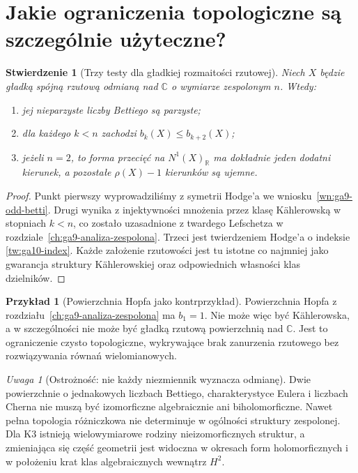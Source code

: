 \documentclass[11pt,a4paper,openany]{report}
\numberwithin{equation}{section}
\theoremstyle{plain}
\newtheorem{stwierdzenie}[twierdzenie]{Stwierdzenie}
\theoremstyle{definition}
\newtheorem{przyklad}[twierdzenie]{Przykład}
\theoremstyle{remark}
\newtheorem{uwaga}[twierdzenie]{Uwaga}
\newcommand{\R}{\mathbb R}
\newcommand{\C}{\mathbb C}
\begin{document}
\section{Jakie ograniczenia topologiczne są szczególnie użyteczne?}
\label{sec:ga10-konsekwencje}

\begin{stwierdzenie}[Trzy testy dla gładkiej rozmaitości rzutowej]
Niech $X$ będzie gładką spójną rzutową odmianą nad $\C$
o wymiarze zespolonym $n$. Wtedy:
\begin{enumerate}[label=\arabic*)]
\item jej nieparzyste liczby Bettiego są parzyste;
\item dla każdego $k<n$ zachodzi $b_k(X)\le b_{k+2}(X)$;
\item jeżeli $n=2$, to forma przecięć na $N^1(X)_{\R}$
ma dokładnie jeden dodatni kierunek, a pozostałe
$\rho(X)-1$ kierunków są ujemne.
\end{enumerate}
\end{stwierdzenie}
\begin{proof}
Punkt pierwszy wyprowadziliśmy z symetrii Hodge'a
we wniosku~\ref{wn:ga9-odd-betti}. Drugi wynika z
injektywności mnożenia przez klasę Kählerowską
w stopniach $k<n$, co zostało uzasadnione z twardego
Lefschetza w rozdziale~\ref{ch:ga9-analiza-zespolona}.
Trzeci jest twierdzeniem Hodge'a o indeksie
\ref{tw:ga10-index}. Każde założenie rzutowości
jest tu istotne co najmniej jako gwarancja struktury
Kählerowskiej oraz odpowiednich własności klas dzielników.
\end{proof}

\begin{przyklad}[Powierzchnia Hopfa jako kontrprzykład]
Powierzchnia Hopfa z rozdziału~\ref{ch:ga9-analiza-zespolona}
ma $b_1=1$. Nie może więc być Kählerowska,
a w szczególności nie może być gładką rzutową
powierzchnią nad $\C$. Jest to ograniczenie
czysto topologiczne, wykrywające brak zanurzenia
rzutowego bez rozwiązywania równań wielomianowych.
\end{przyklad}

\begin{uwaga}[Ostrożność: nie każdy niezmiennik wyznacza odmianę]
Dwie powierzchnie o jednakowych liczbach Bettiego,
charakterystyce Eulera i liczbach Cherna nie muszą być
izomorficzne algebraicznie ani biholomorficzne.
Nawet pełna topologia różniczkowa nie determinuje
w ogólności struktury zespolonej. Dla K3 istnieją
wielowymiarowe rodziny nieizomorficznych struktur,
a zmieniająca się część geometrii jest widoczna
w okresach form holomorficznych i w położeniu krat
klas algebraicznych wewnątrz $H^2$.
\end{uwaga}
\end{document}
